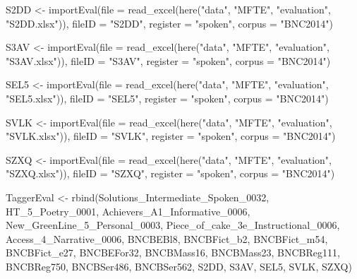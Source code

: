 \documentclass[
  letterpaper,
  DIV=11,
  numbers=noendperiod]{scrreprt}
\newenvironment{Shaded}{\begin{snugshade}}{\end{snugshade}}
\newcommand{\AttributeTok}[1]{\textcolor[rgb]{0.40,0.45,0.13}{#1}}
\newcommand{\FunctionTok}[1]{\textcolor[rgb]{0.28,0.35,0.67}{#1}}
\newcommand{\NormalTok}[1]{\textcolor[rgb]{0.00,0.23,0.31}{#1}}
\newcommand{\OtherTok}[1]{\textcolor[rgb]{0.00,0.23,0.31}{#1}}
\newcommand{\StringTok}[1]{\textcolor[rgb]{0.13,0.47,0.30}{#1}}
\begin{document}
\begin{Shaded}
\begin{Highlighting}[]
\NormalTok{S2DD }\OtherTok{\textless{}{-}} \FunctionTok{importEval}\NormalTok{(}\AttributeTok{file =} \FunctionTok{read\_excel}\NormalTok{(}\FunctionTok{here}\NormalTok{(}\StringTok{"data"}\NormalTok{, }\StringTok{"MFTE"}\NormalTok{, }\StringTok{"evaluation"}\NormalTok{, }\StringTok{"S2DD.xlsx"}\NormalTok{)), }\AttributeTok{fileID =} \StringTok{"S2DD"}\NormalTok{, }\AttributeTok{register =} \StringTok{"spoken"}\NormalTok{, }\AttributeTok{corpus =} \StringTok{"BNC2014"}\NormalTok{)}

\NormalTok{S3AV }\OtherTok{\textless{}{-}} \FunctionTok{importEval}\NormalTok{(}\AttributeTok{file =} \FunctionTok{read\_excel}\NormalTok{(}\FunctionTok{here}\NormalTok{(}\StringTok{"data"}\NormalTok{, }\StringTok{"MFTE"}\NormalTok{, }\StringTok{"evaluation"}\NormalTok{, }\StringTok{"S3AV.xlsx"}\NormalTok{)), }\AttributeTok{fileID =} \StringTok{"S3AV"}\NormalTok{, }\AttributeTok{register =} \StringTok{"spoken"}\NormalTok{, }\AttributeTok{corpus =} \StringTok{"BNC2014"}\NormalTok{)}

\NormalTok{SEL5 }\OtherTok{\textless{}{-}} \FunctionTok{importEval}\NormalTok{(}\AttributeTok{file =} \FunctionTok{read\_excel}\NormalTok{(}\FunctionTok{here}\NormalTok{(}\StringTok{"data"}\NormalTok{, }\StringTok{"MFTE"}\NormalTok{, }\StringTok{"evaluation"}\NormalTok{, }\StringTok{"SEL5.xlsx"}\NormalTok{)), }\AttributeTok{fileID =} \StringTok{"SEL5"}\NormalTok{, }\AttributeTok{register =} \StringTok{"spoken"}\NormalTok{, }\AttributeTok{corpus =} \StringTok{"BNC2014"}\NormalTok{)}

\NormalTok{SVLK }\OtherTok{\textless{}{-}} \FunctionTok{importEval}\NormalTok{(}\AttributeTok{file =} \FunctionTok{read\_excel}\NormalTok{(}\FunctionTok{here}\NormalTok{(}\StringTok{"data"}\NormalTok{, }\StringTok{"MFTE"}\NormalTok{, }\StringTok{"evaluation"}\NormalTok{, }\StringTok{"SVLK.xlsx"}\NormalTok{)), }\AttributeTok{fileID =} \StringTok{"SVLK"}\NormalTok{, }\AttributeTok{register =} \StringTok{"spoken"}\NormalTok{, }\AttributeTok{corpus =} \StringTok{"BNC2014"}\NormalTok{)}

\NormalTok{SZXQ }\OtherTok{\textless{}{-}} \FunctionTok{importEval}\NormalTok{(}\AttributeTok{file =} \FunctionTok{read\_excel}\NormalTok{(}\FunctionTok{here}\NormalTok{(}\StringTok{"data"}\NormalTok{, }\StringTok{"MFTE"}\NormalTok{, }\StringTok{"evaluation"}\NormalTok{, }\StringTok{"SZXQ.xlsx"}\NormalTok{)), }\AttributeTok{fileID =} \StringTok{"SZXQ"}\NormalTok{, }\AttributeTok{register =} \StringTok{"spoken"}\NormalTok{, }\AttributeTok{corpus =} \StringTok{"BNC2014"}\NormalTok{)}

\NormalTok{TaggerEval }\OtherTok{\textless{}{-}} \FunctionTok{rbind}\NormalTok{(Solutions\_Intermediate\_Spoken\_0032, HT\_5\_Poetry\_0001, Achievers\_A1\_Informative\_0006, New\_GreenLine\_5\_Personal\_0003, Piece\_of\_cake\_3e\_Instructional\_0006, Access\_4\_Narrative\_0006, BNCBEBl8, BNCBFict\_b2, BNCBFict\_m54, BNCBFict\_e27, BNCBEFor32, BNCBMass16, BNCBMass23, BNCBReg111, BNCBReg750, BNCBSer486, BNCBSer562, S2DD, S3AV, SEL5, SVLK, SZXQ)}
\end{Highlighting}
\end{Shaded}
\end{document}
